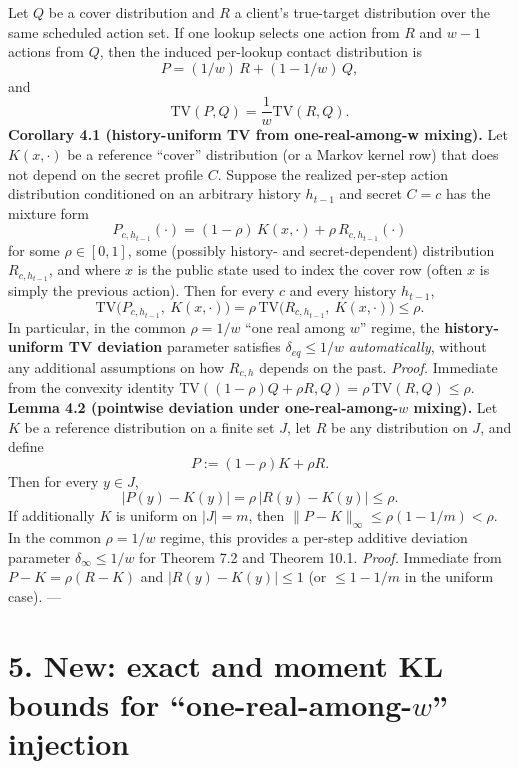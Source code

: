 \documentclass[11pt]{article}
\begin{document}
Let \(Q\) be a cover distribution and \(R\) a client's true-target
distribution over the same scheduled action set. If one lookup selects
one action from \(R\) and \(w-1\) actions from \(Q\), then the induced
per-lookup contact distribution is \[
P = (1/w)\,R + (1-1/w)\,Q,
\] and \[
\mathrm{TV}(P,Q)=\frac{1}{w}\mathrm{TV}(R,Q).
\] \textbf{Corollary 4.1 (history-uniform TV from one-real-among-w
mixing).} Let \(K(x,\cdot)\) be a reference ``cover'' distribution (or a
Markov kernel row) that does not depend on the secret profile \(C\).
Suppose the realized per-step action distribution conditioned on an
arbitrary history \(h_{t-1}\) and secret \(C=c\) has the mixture form \[
P_{c,h_{t-1}}(\cdot) = (1-\rho)\,K(x,\cdot) + \rho\,R_{c,h_{t-1}}(\cdot)
\] for some \(\rho\in[0,1]\), some (possibly history- and
secret-dependent) distribution \(R_{c,h_{t-1}}\), and where \(x\) is the
public state used to index the cover row (often \(x\) is simply the
previous action). Then for every \(c\) and every history \(h_{t-1}\), \[
\mathrm{TV}\bigl(P_{c,h_{t-1}},\ K(x,\cdot)\bigr) = \rho\,\mathrm{TV}\bigl(R_{c,h_{t-1}},\ K(x,\cdot)\bigr) \le \rho.
\] In particular, in the common \(\rho=1/w\) ``one real among \(w\)''
regime, the \textbf{history-uniform TV deviation} parameter satisfies
\(\delta_{eq}\le 1/w\) \emph{automatically}, without any additional
assumptions on how \(R_{c,h}\) depends on the past. \emph{Proof.}
Immediate from the convexity identity
\(\mathrm{TV}((1-\rho)Q+\rho R,Q)=\rho\,\mathrm{TV}(R,Q)\le \rho\).
\textbf{Lemma 4.2 (pointwise deviation under one-real-among-\(w\)
mixing).} Let \(K\) be a reference distribution on a finite set \(J\),
let \(R\) be any distribution on \(J\), and define \[
P:= (1-\rho)K + \rho R.
\] Then for every \(y\in J\), \[
|P(y)-K(y)| = \rho\,|R(y)-K(y)| \le \rho.
\] If additionally \(K\) is uniform on \(|J|=m\), then
\(\|P-K\|_\infty \le \rho(1-1/m) < \rho\). In the common \(\rho=1/w\)
regime, this provides a per-step additive deviation parameter
\(\delta_\infty \le 1/w\) for Theorem 7.2 and Theorem 10.1.
\emph{Proof.} Immediate from \(P-K=\rho(R-K)\) and \(|R(y)-K(y)|\le 1\)
(or \(\le 1-1/m\) in the uniform case). ---

\hypertarget{new-exact-and-moment-kl-bounds-for-one-real-among-w-injection}{%
\section{\texorpdfstring{5. New: exact and moment KL bounds for
``one-real-among-\(w\)''
injection}{5. New: exact and moment KL bounds for ``one-real-among-w'' injection}}\label{new-exact-and-moment-kl-bounds-for-one-real-among-w-injection}}
\end{document}
